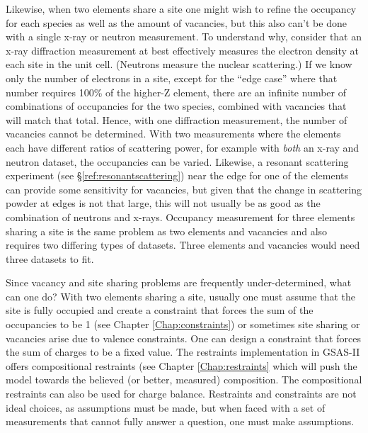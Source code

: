 Likewise, when two elements share a site one might wish to refine the occupancy for each species as well as the amount of vacancies, but this also can't be done with a single x-ray or neutron measurement. 
To understand why, consider that an x-ray diffraction measurement at best effectively measures the electron density at each site in the unit cell. (Neutrons measure the nuclear scattering.) 
If we know only the number of electrons in a site, except for the ``edge case'' where that number requires 100\% of the higher-Z element, there are an infinite number of combinations of occupancies for the two species, combined with vacancies that will match that total. 
Hence, with one diffraction measurement, the number of vacancies cannot be determined. With two measurements where the elements each have different ratios of scattering power, for example with \textit{both} an x-ray and neutron dataset, the occupancies can be varied. 
Likewise, a resonant scattering experiment (see \S\ref{ref:resonantscattering}) near the edge for one of the elements can provide some sensitivity for vacancies, but given that the change in scattering powder at edges is not that large, this will not usually be as good as the combination of neutrons and x-rays. 
Occupancy measurement for three elements sharing a site is the same problem as two elements and vacancies and also requires two differing types of datasets. Three elements and vacancies would need three datasets to fit. 

Since vacancy and site sharing problems are frequently under-determined, what can one do? With two elements sharing a site, usually one must assume that the site is fully occupied and create a constraint that forces the sum of the occupancies to be 1 (see Chapter \ref{Chap:constraints}) or sometimes site sharing or vacancies arise due to valence constraints. One can design a constraint that forces the sum of charges to be a fixed value. The restraints implementation in GSAS-II offers compositional restraints (see Chapter \ref{Chap:restraints} which will push the model towards the believed (or better, measured) composition. The compositional restraints can also be used for charge balance. Restraints and constraints are not ideal choices, as assumptions must be made, but when faced with a set of measurements that cannot fully answer a question, one must make assumptions.

